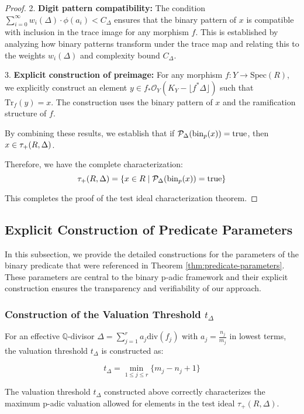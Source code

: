 \begin{proof}
2. \textbf{Digit pattern compatibility:} The condition $\sum_{i=0}^{\infty} w_i(\Delta) \cdot \phi(a_i) < C_{\Delta}$ ensures that the binary pattern of $x$ is compatible with inclusion in the trace image for any morphism $f$. This is established by analyzing how binary patterns transform under the trace map and relating this to the weights $w_i(\Delta)$ and complexity bound $C_{\Delta}$.

3. \textbf{Explicit construction of preimage:} For any morphism $f: Y \to \text{Spec}(R)$, we explicitly construct an element $y \in f_*\mathcal{O}_Y(K_Y - \lfloor f^*\Delta\rfloor)$ such that $\text{Tr}_f(y) = x$. The construction uses the binary pattern of $x$ and the ramification structure of $f$.

By combining these results, we establish that if $\mathcal{P}_{\Delta}(\operatorname{bin}_p(x)) = \text{true}$, then $x \in \tau_+(R,\Delta)$.

Therefore, we have the complete characterization:
$$\tau_+(R,\Delta) = \{x \in R \mid \mathcal{P}_{\Delta}(\operatorname{bin}_p(x)) = \text{true}\}$$

This completes the proof of the test ideal characterization theorem.
\end{proof}

\subsection{Explicit Construction of Predicate Parameters}

In this subsection, we provide the detailed constructions for the parameters of the binary predicate that were referenced in Theorem \ref{thm:predicate-parameters}. These parameters are central to the binary p-adic framework and their explicit construction ensures the transparency and verifiability of our approach.

\subsubsection{Construction of the Valuation Threshold $t_\Delta$}

For an effective $\mathbb{Q}$-divisor $\Delta = \sum_{j=1}^{r} a_j \text{div}(f_j)$ with $a_j = \frac{n_j}{m_j}$ in lowest terms, the valuation threshold $t_\Delta$ is constructed as:

$$t_\Delta = \min_{1 \leq j \leq r} \{m_j - n_j + 1\}$$

\begin{proposition}\label{prop:threshold-correctness}
The valuation threshold $t_\Delta$ constructed above correctly characterizes the maximum p-adic valuation allowed for elements in the test ideal $\tau_+(R,\Delta)$.
\end{proposition}

